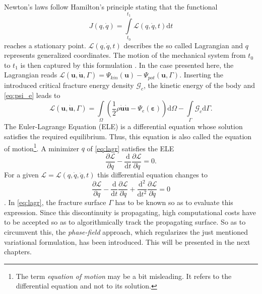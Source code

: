 Newton's laws follow Hamilton's principle stating that the functional 
\begin{equation} \label{eq:fctal_Hamilton}
	J\left(q,\dot{q}\right)=\int\limits_{t_{0}}^{t_{1}}\mathcal{L}\left(q,\dot{q},t\right)\mathrm{d}t
\end{equation} reaches a stationary point. $\mathcal{L}\left(q,\dot{q},t\right)$ describes the so called Lagrangian and $q$ represents generalized coordinates. The motion of the mechanical system from $t_{0}$ to $t_{1}$ is then captured by this formulation \citep{01_B_LagrMech}. In the case presented here, the Lagrangian reads $\mathcal{L}\left(\mathbf{u},\dot{\mathbf{u}},\Gamma\right)=\Psi_{kin}\left(\mathbf{u}\right)-\Psi_{pot}\left(\mathbf{u},\Gamma\right)$. Inserting the introduced critical fracture energy density $\mathcal{G}_{c}$, the kinetic energy of the body and \eqref{eq:psi_e} leads to
\begin{equation} \label{eq:lagr}
	\mathcal{L}\left(\mathbf{u},\dot{\mathbf{u}},\Gamma\right) = \int\limits_{\Omega}\left(\frac{1}{2}\rho\dot{\mathbf{u}}\dot{\mathbf{u}}-\Psi_{e}\left(\bm{\varepsilon}\right)\right)\mathrm{d}\Omega - \int\limits_{\Gamma}\mathcal{G}_{c}\mathrm{d}\Gamma.
\end{equation}
The Euler-Lagrange Equation (ELE) is a differential equation whose solution satisfies the required equilibrium. Thus, this equation is also called the equation of motion\footnote{The term \textit{equation of motion} may be a bit misleading. It refers to the differential equation and not to its solution.}. A minimizer $q$ of \eqref{eq:lagr} satisfies the ELE
\begin{equation} \label{eq:ELE_O2}
	\dfrac{\partial\mathcal{L}}{\partial q}-\dfrac{\mathrm{d}}{\mathrm{d}t}\dfrac{\partial\mathcal{L}}{\partial\dot{q}}=0.
\end{equation}
For a given $\mathcal{L}=\mathcal{L}\left(q,\dot{q},\ddot{q}, t\right)$ this differential equation changes to
\begin{equation} \label{eq:ELE:_O4}
	\dfrac{\partial\mathcal{L}}{\partial q}-\dfrac{\mathrm{d}}{\mathrm{d}t}\dfrac{\partial\mathcal{L}}{\partial\dot{q}}+\dfrac{\mathrm{d}^{2}}{\mathrm{d}t^{2}}\dfrac{\partial\mathcal{L}}{\partial\ddot{q}}=0
\end{equation}
\citep{01_B_LagrMech}. In \eqref{eq:lagr}, the fracture surface $\Gamma$ has to be known so as to evaluate this expression. Since this discontinuity is propagating, high computational costs have to be accepted so as to algorithmically track the propagating surface. So as to circumvent this, the \textit{phase-field} approach, which regularizes the just mentioned variational formulation, has been introduced. This will be presented in the next chapters.


